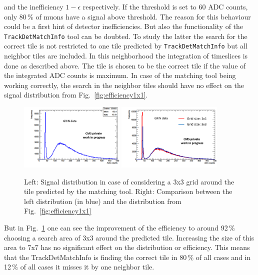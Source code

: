 			and the inefficiency $1-\epsilon$ respectively.
			If the threshold is set to 60 ADC counts, only 80\,\% of muons have a signal above threshold.
			The reason for this behaviour could be a first hint of detector inefficiencies.
			But also the functionality of the \verb+TrackDetMatchInfo+ tool can be doubted.
			To study the latter the search for the correct tile is not restricted to one tile predicted by \verb+TrackDetMatchInfo+ but all neighbor tiles are included.
			In this neighborhood the integration of timeslices is done as described above.
			The tile is chosen to be the correct tile if the value of the integrated ADC counts is maximum.
			In case of the matching tool being working correctly, the search in the neighbor tiles should have no effect on the signal distribution from Fig.\ \ref{fig:efficiency1x1}.
			\begin{figure}[htbp]
				\centering
				\includegraphics[width=0.45\textwidth]{Figures/erdogan/neighborhood2.png}
				\includegraphics[width=0.45\textwidth]{Figures/erdogan/neighborhood.png}
				\caption{Left: Signal distribution in case of considering a 3x3 grid around the tile predicted by the matching tool. Right: Comparison between the left distribution (in blue) and the distribution from Fig.\ \ref{fig:efficiency1x1}}
				\label{fig:neighborhood}
			\end{figure}
			But in Fig.\ \ref{fig:neighborhood} one can see the improvement of the efficiency to around 92\,\% choosing a search area of 3x3 around the predicted tile.
			Increasing the size of this area to 7x7 has no significant effect on the distribution or efficiency.
			This means that the TrackDetMatchInfo is finding the correct tile in 80\,\% of all cases and in 12\,\% of all cases it misses it by one neighbor tile. \\
